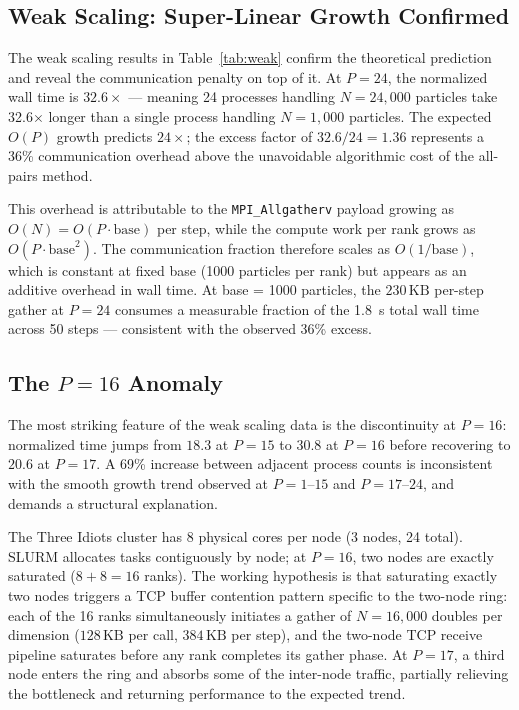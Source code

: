 \documentclass[11pt]{article}
\begin{document}
\subsection{Weak Scaling: Super-Linear Growth Confirmed}

The weak scaling results in Table~\ref{tab:weak} confirm the theoretical prediction and reveal the communication penalty on top of it. At $P = 24$, the normalized wall time is $32.6\times$ — meaning 24 processes handling $N = 24{,}000$ particles take 32.6$\times$ longer than a single process handling $N = 1{,}000$ particles. The expected $O(P)$ growth predicts $24\times$; the excess factor of $32.6 / 24 = 1.36$ represents a 36\% communication overhead above the unavoidable algorithmic cost of the all-pairs method.

This overhead is attributable to the \texttt{MPI\_Allgatherv} payload growing as $O(N) = O(P \cdot \text{base})$ per step, while the compute work per rank grows as $O(P \cdot \text{base}^2)$. The communication fraction therefore scales as $O(1/\text{base})$, which is constant at fixed base (1000 particles per rank) but appears as an additive overhead in wall time. At base = 1000 particles, the $230\,\text{KB}$ per-step gather at $P = 24$ consumes a measurable fraction of the 1.8~s total wall time across 50 steps — consistent with the observed 36\% excess.

\subsection{The $P = 16$ Anomaly}
\label{sec:anomaly}

The most striking feature of the weak scaling data is the discontinuity at $P = 16$: normalized time jumps from $18.3$ at $P = 15$ to $30.8$ at $P = 16$ before recovering to $20.6$ at $P = 17$. A 69\% increase between adjacent process counts is inconsistent with the smooth growth trend observed at $P = 1$--$15$ and $P = 17$--$24$, and demands a structural explanation.

The Three Idiots cluster has 8 physical cores per node (3 nodes, 24 total). SLURM allocates tasks contiguously by node; at $P = 16$, two nodes are exactly saturated ($8 + 8 = 16$ ranks). The working hypothesis is that saturating exactly two nodes triggers a TCP buffer contention pattern specific to the two-node ring: each of the 16 ranks simultaneously initiates a gather of $N = 16{,}000$ doubles per dimension ($128\,\text{KB}$ per call, $384\,\text{KB}$ per step), and the two-node TCP receive pipeline saturates before any rank completes its gather phase. At $P = 17$, a third node enters the ring and absorbs some of the inter-node traffic, partially relieving the bottleneck and returning performance to the expected trend.
\end{document}
